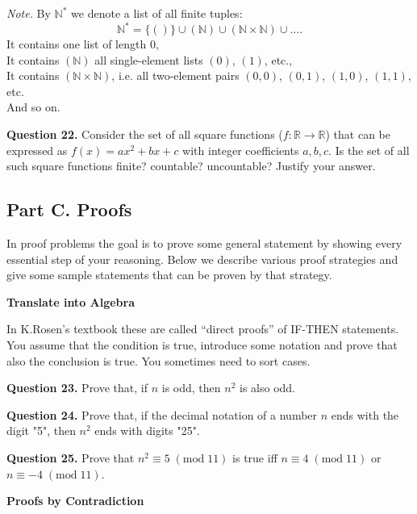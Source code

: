 \documentclass[jou]{apa6}
\begin{document}
{\em Note.} By $\mathbb{N}^{\ast}$ we denote a list of all finite tuples: 
$$\mathbb{N}^{\ast} = \{()\} \cup (\mathbb{N}) \cup (\mathbb{N} \times \mathbb{N}) \cup \ldots.$$
It contains one list of length $0$,\\
It contains $(\mathbb{N})$ all single-element lists $(0)$, $(1)$, etc.,\\
It contains $(\mathbb{N} \times \mathbb{N})$, i.e. all two-element pairs $(0,0)$, $(0,1)$, $(1,0)$, $(1,1)$, etc.\\
And so on.

\vspace{6pt}
{\bf Question 22.} Consider the set of all square functions ($f:\mathbb{R} \rightarrow \mathbb{R}$)
that can be expressed as $f(x) = ax^2 + bx + c$ with integer coefficients $a,b,c$. 
Is the set of all such square functions finite? countable? uncountable? 
Justify your answer.





\subsection{Part C. Proofs}

In proof problems the goal is to prove some general statement by 
showing every essential step of your reasoning.
Below we describe various proof strategies and give some sample
statements that can be proven by that strategy.

\vspace{6pt}
{\bf Translate into Algebra}

In K.Rosen's textbook these are called ``direct proofs''
of IF-THEN statements. 
You assume that the condition is true, introduce some notation and 
prove that also the conclusion is true.
You sometimes need to sort cases. 

\vspace{6pt}
{\bf Question 23.} Prove that, if $n$ is odd, then $n^2$ is also odd. 

\vspace{6pt}
{\bf Question 24.} Prove that, if the decimal notation of a number $n$ ends with the digit "5", 
then $n^2$ ends with digits "25". 

\vspace{6pt}
{\bf Question 25.}
Prove that $n^2 \equiv 5\;(\text{mod}\;11)$ is true
iff
$n \equiv 4\;(\text{mod}\;11)$ 
or $n \equiv -4\;(\text{mod}\;11)$.

\vspace{20pt}
{\bf Proofs by Contradiction}
\end{document}
